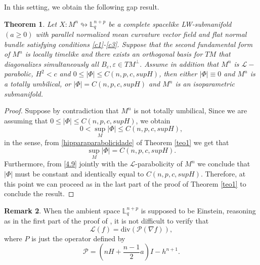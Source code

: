 \documentclass[leqno,11pt]{amsart}
\theoremstyle{plain}
\newtheorem{theorem}{\indent\sc Theorem}[section]
\theoremstyle{definition}
\newtheorem{remark}[theorem]{\indent\sc Remark}
\numberwithin{equation}{section}
\begin{document}
In this setting, we obtain the following gap result.


\begin{theorem}
Let $X:M^n\looparrowright \mathbb{L}^{n+p}_{q}$ be a complete spacelike LW-submanifold $(a\geq0)$ with parallel normalized mean curvature vector field and flat normal bundle satisfying conditions \eqref{c1}-\eqref{c3}. Suppose that the second fundamental form of $M^n$ is locally timelike and there exists an orthogonal basis for $TM$ that diagonalizes simultaneously all $B_{\varepsilon},
\varepsilon\in TM^{\perp}.$ Assume in addition that $M^n$ is $\mathcal{L}-$parabolic, $H^2<c$ and $0\leq |\Phi|\leq C(n,p,c,supH)$, then either $|\Phi|\equiv 0$ and $M^n$ is a totally umbilical, or $|\Phi| =  C(n,p,c,supH)$ and $M^n$ is an isoparametric submanifold.
\end{theorem}

\begin{proof} Suppose by contradiction that $M^n$ is not totally umbilical, Since we are assuming that $0 \leq |\Phi|\leq C(n,p,c,supH)$, we obtain
$$
0< \sup_{M}|\Phi| \leq C(n,p,c,supH),
$$
in the sense, from \eqref{hipparaparabolicidade} of Theorem \ref{teo1} we get that
\begin{equation}
\sup_M |\Phi| = C(n,p,c,supH).
\end{equation}
Furthermore, from \eqref{4.9} jointly with the $\mathcal{L}$-parabolicity of $M^n$ we conclude that $|\Phi|$ must be constant and identically equal to $C(n,p,c,supH)$. Therefore, at this point we can proceed as in the last part of the proof of Theorem \ref{teo1} to conclude the result.
  
\end{proof}

\begin{remark}
When the ambient space $\mathbb{L}^{n+p}_q$ is supposed to be Einstein, reasoning as in the first part of the proof of \cite[Theorem 1.1]{Lima: 13}, it is not difficult to verify that
\begin{equation}\label{newL}
\mathcal{L}(f) = \mathrm{div}(\mathcal{P}(\nabla f)),
\end{equation}
where $P$ is just the operator defined by
\begin{equation}\label{newP}
\mathcal{P} = \left( nH + \dfrac{n-1}{2}a \right) I - h^{n+1}.
\end{equation}
\end{remark}
\end{document}

